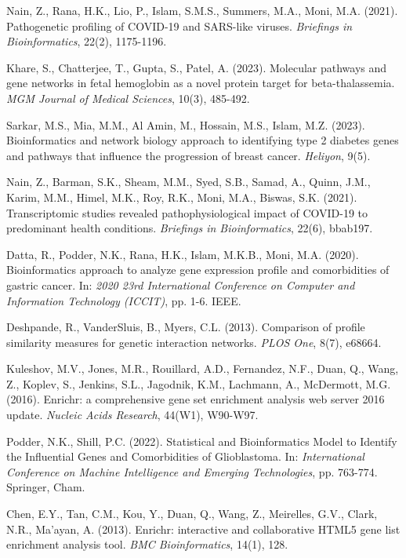 \documentclass[a4paper,12pt,openbib,oneside]{memoir}
\theoremstyle{plain}
\theoremstyle{plain}
\theoremstyle{plain}
\theoremstyle{definition}
\theoremstyle{plain}
\theoremstyle{plain}
\theoremstyle{plain}
\begin{document}
\begin{thebibliography}{99}
 Nain, Z., Rana, H.K., Lio, P., Islam, S.M.S., Summers, M.A., Moni, M.A. (2021). Pathogenetic profiling of COVID-19 and SARS-like viruses. \textit{Briefings in Bioinformatics}, 22(2), 1175-1196.

 Khare, S., Chatterjee, T., Gupta, S., Patel, A. (2023). Molecular pathways and gene networks in fetal hemoglobin as a novel protein target for beta-thalassemia. \textit{MGM Journal of Medical Sciences}, 10(3), 485-492.

 Sarkar, M.S., Mia, M.M., Al Amin, M., Hossain, M.S., Islam, M.Z. (2023). Bioinformatics and network biology approach to identifying type 2 diabetes genes and pathways that influence the progression of breast cancer. \textit{Heliyon}, 9(5).

 Nain, Z., Barman, S.K., Sheam, M.M., Syed, S.B., Samad, A., Quinn, J.M., Karim, M.M., Himel, M.K., Roy, R.K., Moni, M.A., Biswas, S.K. (2021). Transcriptomic studies revealed pathophysiological impact of COVID-19 to predominant health conditions. \textit{Briefings in Bioinformatics}, 22(6), bbab197.

 Datta, R., Podder, N.K., Rana, H.K., Islam, M.K.B., Moni, M.A. (2020). Bioinformatics approach to analyze gene expression profile and comorbidities of gastric cancer. In: \textit{2020 23rd International Conference on Computer and Information Technology (ICCIT)}, pp. 1-6. IEEE.

 Deshpande, R., VanderSluis, B., Myers, C.L. (2013). Comparison of profile similarity measures for genetic interaction networks. \textit{PLOS One}, 8(7), e68664.

 Kuleshov, M.V., Jones, M.R., Rouillard, A.D., Fernandez, N.F., Duan, Q., Wang, Z., Koplev, S., Jenkins, S.L., Jagodnik, K.M., Lachmann, A., McDermott, M.G. (2016). Enrichr: a comprehensive gene set enrichment analysis web server 2016 update. \textit{Nucleic Acids Research}, 44(W1), W90-W97.

 Podder, N.K., Shill, P.C. (2022). Statistical and Bioinformatics Model to Identify the Influential Genes and Comorbidities of Glioblastoma. In: \textit{International Conference on Machine Intelligence and Emerging Technologies}, pp. 763-774. Springer, Cham.

 Chen, E.Y., Tan, C.M., Kou, Y., Duan, Q., Wang, Z., Meirelles, G.V., Clark, N.R., Ma'ayan, A. (2013). Enrichr: interactive and collaborative HTML5 gene list enrichment analysis tool. \textit{BMC Bioinformatics}, 14(1), 128.


\end{thebibliography}
\end{document}
